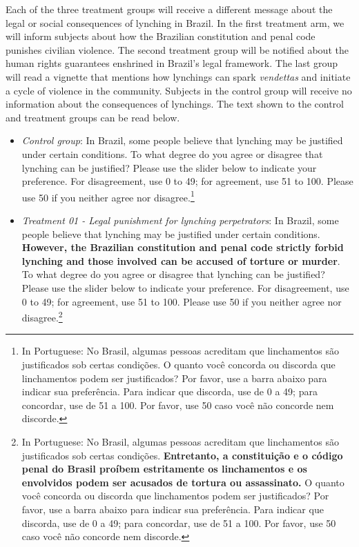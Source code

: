 \documentclass[12pt,a4paper,]{article}
\providecommand{\tightlist}{%
   \setlength{\itemsep}{0pt}\setlength{\parskip}{0pt}}
\begin{document}
Each of the three treatment groups will receive a different message
about the legal or social consequences of lynching in Brazil. In the
first treatment arm, we will inform subjects about how the Brazilian
constitution and penal code punishes civilian violence. The second
treatment group will be notified about the human rights guarantees
enshrined in Brazil's legal framework. The last group will read a
vignette that mentions how lynchings can spark \emph{vendettas} and
initiate a cycle of violence in the community. Subjects in the control
group will receive no information about the consequences of lynchings.
The text shown to the control and treatment groups can be read below.

\begin{itemize}
\tightlist
\item
  \emph{Control group}: In Brazil, some people believe that lynching may
  be justified under certain conditions. To what degree do you agree or
  disagree that lynching can be justified? Please use the slider below
  to indicate your preference. For disagreement, use 0 to 49; for
  agreement, use 51 to 100. Please use 50 if you neither agree nor
  disagree.\footnote{In Portuguese: No Brasil, algumas pessoas acreditam
    que linchamentos são justificados sob certas condições. O quanto
    você concorda ou discorda que linchamentos podem ser justificados?
    Por favor, use a barra abaixo para indicar sua preferência. Para
    indicar que discorda, use de 0 a 49; para concordar, use de 51 a
    100. Por favor, use 50 caso você não concorde nem discorde.}
\end{itemize}

\begin{itemize}
\tightlist
\item
  \emph{Treatment 01 - Legal punishment for lynching perpetrators}: In
  Brazil, some people believe that lynching may be justified under
  certain conditions. \textbf{However, the Brazilian constitution and
  penal code strictly forbid lynching and those involved can be accused
  of torture or murder}. To what degree do you agree or disagree that
  lynching can be justified? Please use the slider below to indicate
  your preference. For disagreement, use 0 to 49; for agreement, use 51
  to 100. Please use 50 if you neither agree nor disagree.\footnote{In
    Portuguese: No Brasil, algumas pessoas acreditam que linchamentos
    são justificados sob certas condições. \textbf{Entretanto, a
    constituição e o código penal do Brasil proíbem estritamente os
    linchamentos e os envolvidos podem ser acusados de tortura ou
    assassinato.} O quanto você concorda ou discorda que linchamentos
    podem ser justificados? Por favor, use a barra abaixo para indicar
    sua preferência. Para indicar que discorda, use de 0 a 49; para
    concordar, use de 51 a 100. Por favor, use 50 caso você não concorde
    nem discorde.}
\end{itemize}
\end{document}
